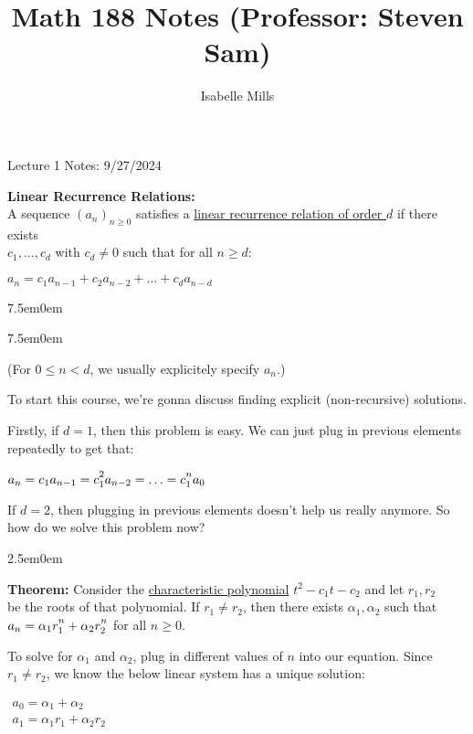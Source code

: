\documentclass{book}
\title{Math 188 Notes (Professor: Steven Sam)}
\author{Isabelle Mills}
\newcommand{\hOne}{%
   \color{Black}%
   \fontsize{14}{16}\selectfont%
}
\newcommand{\hTwo}{%
\color{MidnightBlue}%
   \fontsize{13}{15}\selectfont%
}
\newcommand{\myComment}{%
   \color{RawerSienna}%
   \fontsize{12}{14}\selectfont%
}
\newenvironment{myIndent}{%
   \begin{adjustwidth}{2.5em}{0em}%
}{%
   \end{adjustwidth}%
}
\newenvironment{myTindent}{%
   \begin{adjustwidth}{7.5em}{0em}%
}{%
   \end{adjustwidth}%
}
\newcommand{\udefine}[1]{{%
   \setulcolor{Red}%
   \setul{0.14em}{0.07em}%
   \ul{#1}%
}}
\newcommand{\blab}[1]{\textbf{#1}}
\newcommand{\retTwo}{\hfill\bigbreak}
\newcommand{\mHeader}[1]{{
   \color{Black}%
   \fontsize{20}{18}\selectfont%
   #1\retTwo
}}
\begin{document}
\maketitle{}
\setul{0.14em}{0.07em}
\calibri

\hOne
\mHeader{Lecture 1 Notes: 9/27/2024}

\blab{Linear Recurrence Relations:}\\
A sequence $(a_n)_{n \geq 0}$ satisfies a \udefine{linear recurrence relation of order $d$} if there exists\\ $c_1, \ldots, c_d$ with $c_d \neq 0$ such that for all $n \geq d$:

{\centering $a_n = c_1a_{n-1} + c_2a_{n-2} + \ldots + c_da_{n-d}$\par}


\begin{myTindent}\begin{myTindent}\myComment
   (For $0 \leq n < d$, we usually explicitely specify $a_n$.)\retTwo
\end{myTindent}\end{myTindent}

To start this course, we're gonna discuss finding explicit (non-recursive) solutions.\retTwo

Firstly, if $d = 1$, then this problem is easy. We can just plug in previous elements repeatedly to get that:

{\centering $a_n = c_1a_{n-1} = c_1^{\vphantom{|}2}a_{n-2} = \ldots = c_1^{\vphantom{|}n}a_0$ \retTwo\par}

If $d = 2$, then plugging in previous elements doesn't help us really anymore. So how do we solve this problem now?\\

\begin{myIndent}\hTwo
   \blab{Theorem:} Consider the \udefine{characteristic polynomial} $t^2 - c_1t - c_2$ and let $r_1, r_2$\\ be the roots of that polynomial. If $r_1 \neq r_2$, then there exists $\alpha_1, \alpha_2$ such that\\ $a_n = \alpha_1r_1^{\vphantom{|}n} + \alpha_2r_2^{\vphantom{|}n}$ for all $n \geq 0$.\retTwo

   To solve for $\alpha_1$ and $\alpha_2$, plug in different values of $n$ into our equation. Since $r_1 \neq r_2$, we know the below linear system has a unique solution:

   {\centering $ 
   \begin{matrix}
      a_0 = \alpha_1 + \alpha_2 \\ a_1 = \alpha_1 r_1 + \alpha_2 r_2
   \end{matrix}$ \retTwo\par}
\end{myIndent}
\end{document}
